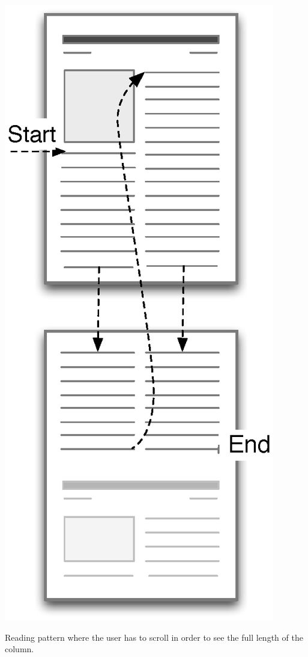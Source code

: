 \begin{sidefigure}%
	\vspace{-220pt}
	\myfloatalign%
	\includegraphics[width=\marginparwidth]{img/reading1} 
	\caption{Reading pattern where the user has to scroll in order to see the full length of the column.}%
	\label{fig:reading1}%
\end{sidefigure}


